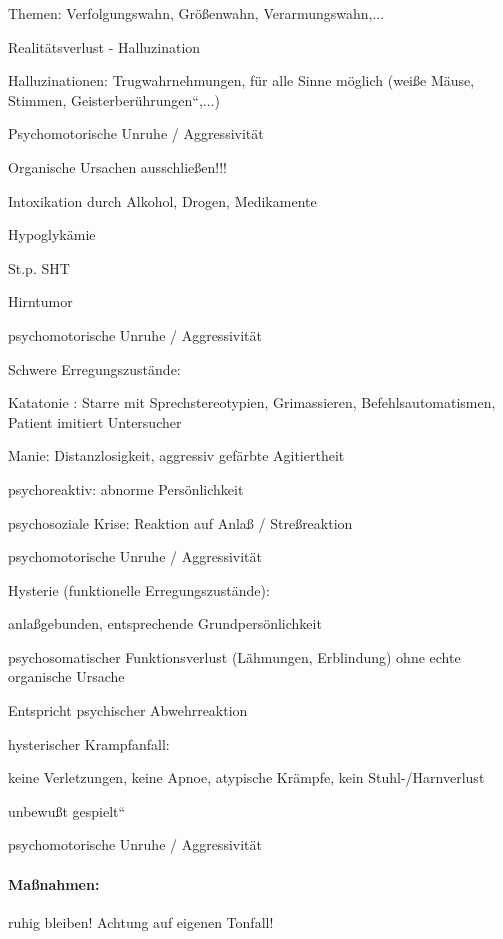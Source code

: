 Themen: Verfolgungswahn, Grö{\ss}enwahn,  Verarmungswahn,...


Realitätsverlust - Halluzination


Halluzinationen: Trugwahrnehmungen,  f\"ur alle Sinne möglich
(wei{\ss}e Mäuse,  Stimmen,
{\quotedblbase}Geisterber\"uhrungen{\textquotedblleft},...)


Psychomotorische Unruhe /  Aggressivität


Organische Ursachen ausschlie{\ss}en!!!

{\mdseries\color[rgb]{0.0,0.0,0.5019608}
Intoxikation durch Alkohol, Drogen,  Medikamente}


Hypoglykämie

St.p. SHT

Hirntumor

psychomotorische Unruhe /  Aggressivität

Schwere Erregungszustände:

Katatonie : Starre mit Sprechstereotypien, Grimassieren,
Befehlsautomatismen, Patient imitiert Untersucher

Manie: Distanzlosigkeit, aggressiv gefärbte Agitiertheit

psychoreaktiv: abnorme Persönlichkeit

psychosoziale Krise: Reaktion auf Anla{\ss} / Stre{\ss}reaktion

psychomotorische Unruhe /  Aggressivität

Hysterie (funktionelle Erregungszustände):

anla{\ss}gebunden, entsprechende Grundpersönlichkeit

psychosomatischer Funktionsverlust (Lähmungen, Erblindung) ohne echte
organische Ursache

Entspricht psychischer Abwehrreaktion

{\mdseries\color[rgb]{0.0,0.0,0.5019608}
hysterischer Krampfanfall:}

{\mdseries
keine Verletzungen, keine Apnoe, atypische Krämpfe, kein
Stuhl-/Harnverlust}

{\mdseries
unbewu{\ss}t {\quotedblbase}gespielt{\textquotedblleft}}

{\mdseries
psychomotorische Unruhe /  Aggressivität}

\paragraph{Ma{\ss}nahmen:}

{\mdseries
ruhig bleiben! Achtung auf eigenen Tonfall!}

